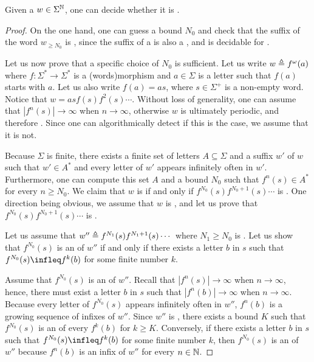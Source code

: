 \begin{lemma}
  \label{morphic-uur:lem}
    Given a  $w \in \Sigma^{\mathbb{N}}$, one can decide
    whether it is .
\end{lemma}
\begin{proof}
  On the one hand, one can guess a bound $N_0$ and check that 
  the suffix of the word $w_{\geq N_0}$ is ,
  since the suffix of a  is also a ,
  and  is decidable for 
  \cite[Theorem 2]{DURAND13}.

  Let us now prove that a specific choice of $N_0$ is sufficient. Let us write
  $w \triangleq f^\omega(a)$ where $f \colon \Sigma^* \to \Sigma^*$ is a
  \kl(words){morphism} and $a \in \Sigma$ is a letter such that $f(a)$ starts
  with $a$. Let us also write $f(a) = a s$, where $s \in \Sigma^+$ is a
  non-empty word. Notice that $w = a s f(s) f^2(s) \cdots$. Without loss of
  generality, one can assume that $|f^n(s)| \to \infty$ when $n \to \infty$,
  otherwise $w$ is ultimately periodic, and therefore . Since one can algorithmically detect if this is the case, we
  assume that it is not.

  Because $\Sigma$ is finite, there exists a finite set of letters $A \subseteq
  \Sigma$ and a suffix $w'$ of $w$ such that $w' \in A^*$ and every letter of
  $w'$ appears infinitely often in $w'$. Furthermore, one can compute this set
  $A$ and a bound $N_0$ such that $f^n(s) \in A^*$ for every $n \geq N_0$. We
  claim that $w$ is  if and only if
  $f^{N_0}(s) f^{N_0 + 1}(s) \cdots$ is .
  One direction being obvious, we assume that $w$ is , and let us prove that $f^{N_0}(s) f^{N_0 + 1}(s) \cdots$ is
  . 

  Let us assume that $w'' \triangleq f^{N_1}(s) f^{N_1 + 1}(s) \cdots$ where $N_1
  \geq N_0$ is . Let us show that $f^{N_0}(s)$ is an
   of $w''$ if and only if there exists a letter $b$ in $s$ such that
  $f^{N_0}(s) \infleq f^{k} (b)$ for some finite number $k$.

  Assume that $f^{N_0}(s)$ is an  of $w''$. Recall that $|f^n(s)| \to
  \infty$ when $n \to \infty$, hence, there must exist a letter $b$ in $s$ such
  that $|f^n(b)| \to \infty$ when $n \to \infty$. Because every letter of
  $f^{N_0}(s)$ appears infinitely often in $w''$, $f^n(b)$ is a growing
  sequence of infixes of $w''$. Since $w''$ is , there
  exists a bound $K$ such that $f^{N_0}(s)$ is an  of every $f^k(b)$
  for $k \geq K$. Conversely, if there exists a letter $b$ in $s$ such that
  $f^{N_0}(s) \infleq f^{k} (b)$ for some finite number $k$, then $f^{N_0}(s)$
  is an  of $w''$ because $f^n(b)$ is an infix of $w''$ for every $n
  \in \mathbb{N}$.


\end{proof}
